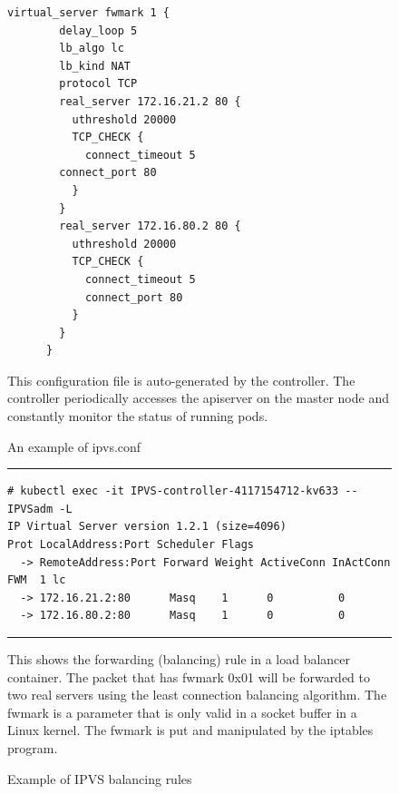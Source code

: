 \begin{figure}[h]
  \centering
  \begin{minipage}{0.7\columnwidth}
    \begin{lstlisting}[frame=single]
      virtual_server fwmark 1 {
        delay_loop 5
        lb_algo lc
        lb_kind NAT
        protocol TCP
        real_server 172.16.21.2 80 {
          uthreshold 20000
          TCP_CHECK {
            connect_timeout 5
        connect_port 80
          }
        }
        real_server 172.16.80.2 80 {
          uthreshold 20000
          TCP_CHECK {
            connect_timeout 5
            connect_port 80
          }
        }
      }
    \end{lstlisting}
  \end{minipage}

  \caption{An example of ipvs.conf}
  \label{fig:ipvs.conf}

  \begin{minipage}{0.9\columnwidth}
    This configuration file is auto-generated by the controller.
    The controller periodically accesses the apiserver on the master node and constantly monitor the status of running pods.
  \end{minipage}
\end{figure}

\begin{figure}[h]
  \centering
  \rule{\columnwidth}{0.4pt}
\begin{verbatim}
# kubectl exec -it IPVS-controller-4117154712-kv633 -- IPVSadm -L
IP Virtual Server version 1.2.1 (size=4096)
Prot LocalAddress:Port Scheduler Flags
  -> RemoteAddress:Port Forward Weight ActiveConn InActConn
FWM  1 lc
  -> 172.16.21.2:80      Masq    1      0          0         
  -> 172.16.80.2:80      Masq    1      0          0
\end{verbatim}
\rule{\columnwidth}{0.4pt}

\caption{Example of IPVS balancing rules}
\label{fig:IPVS rule}

\begin{minipage}{0.9\columnwidth}
  This shows the forwarding (balancing) rule in a load balancer container.
  The packet that has fwmark 0x01 will be forwarded to two real servers using the least connection balancing algorithm.
  The fwmark is a parameter that is only valid in a socket buffer in a Linux kernel.
  The fwmark is put and manipulated by the iptables program.
\end{minipage}
\end{figure}

